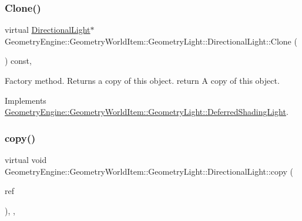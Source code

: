 \subsubsection{\texorpdfstring{Clone()}{Clone()}}
{\footnotesize\ttfamily virtual \mbox{\hyperlink{class_geometry_engine_1_1_geometry_world_item_1_1_geometry_light_1_1_directional_light}{Directional\+Light}}$\ast$ Geometry\+Engine\+::\+Geometry\+World\+Item\+::\+Geometry\+Light\+::\+Directional\+Light\+::\+Clone (\begin{DoxyParamCaption}{ }\end{DoxyParamCaption}) const\hspace{0.3cm}{\ttfamily [inline]}, {\ttfamily [virtual]}}

Factory method. Returns a copy of this object. return A copy of this object. 

Implements \mbox{\hyperlink{class_geometry_engine_1_1_geometry_world_item_1_1_geometry_light_1_1_deferred_shading_light_a7ef4d7b7a41cbda01a55bcb0475484d3}{Geometry\+Engine\+::\+Geometry\+World\+Item\+::\+Geometry\+Light\+::\+Deferred\+Shading\+Light}}.

\mbox{\label{class_geometry_engine_1_1_geometry_world_item_1_1_geometry_light_1_1_directional_light_a8d249928526e73e380c049e27c732db9}} 
\subsubsection{\texorpdfstring{copy()}{copy()}}
{\footnotesize\ttfamily virtual void Geometry\+Engine\+::\+Geometry\+World\+Item\+::\+Geometry\+Light\+::\+Directional\+Light\+::copy (\begin{DoxyParamCaption}\item[{const \mbox{\hyperlink{class_geometry_engine_1_1_geometry_world_item_1_1_geometry_light_1_1_directional_light}{Directional\+Light}} \&}]{ref }\end{DoxyParamCaption})\hspace{0.3cm}{\ttfamily [inline]}, {\ttfamily [protected]}, {\ttfamily [virtual]}}

